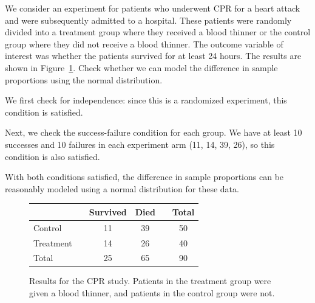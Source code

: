 \begin{examplewrap}
\begin{nexample}{We consider an experiment for patients
    who underwent CPR for a heart attack and were
    subsequently admitted to a
    hospital.
    These patients were randomly divided into a treatment
    group where they received a blood thinner or the control
    group where they did not receive a blood thinner.
    The outcome variable of interest was whether the
    patients survived for at least 24 hours.
    The results are shown in
    Figure~\ref{resultsForCPRStudyInSmallSampleSection}.
    Check whether we can model the difference in
    sample proportions using the normal distribution.}

  We first check for independence:
  since this is a randomized experiment,
  this condition is satisfied.
  
  Next, we check the success-failure condition for
  each group.
  We have at least 10 successes and 10 failures in
  each experiment arm (11, 14, 39, 26),
  so this condition is also satisfied.

  With both conditions satisfied,
  the difference in sample proportions can be
  reasonably modeled using a normal distribution
  for these data.
\end{nexample}
\end{examplewrap}

\begin{figure}[ht]
\centering
\begin{tabular}{lccccc}
\hline
			&& Survived 	& Died 	&& Total \\
\hline
Control		&& 11		& 39		&& 50 \\
Treatment		&& 14		& 26		&& 40 \\
\hline
Total			&& 25		& 65		&& 90 \\
\hline
\end{tabular}
\caption{Results for the CPR study.
    Patients in the treatment group were given
    a blood thinner, and patients in the control
    group were not.}
\label{resultsForCPRStudyInSmallSampleSection}
\end{figure}

